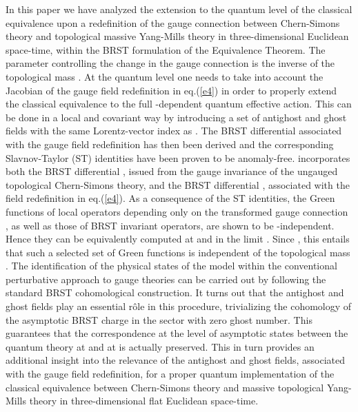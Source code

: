 \documentclass[a4paper,11pt]{article}
\begin{document}
In this paper we have analyzed the extension to the quantum level of  
the classical equivalence upon a redefinition of the gauge connection
between Chern-Simons theory and topological massive Yang-Mills theory
in three-dimensional Euclidean space-time,
within the BRST formulation of the Equivalence Theorem. 
The parameter controlling the change in the gauge connection 
is the inverse \myHighlight{$\lambda$}\coordHE{} of the topological mass \coordHE{}.  
At the quantum level one needs to take into account the Jacobian
of the gauge field redefinition in eq.(\ref{e4}) in order to
properly extend the classical equivalence to the full
\myHighlight{$\lambda$}\coordHE{}-dependent quantum effective action.
This can be done in a local and covariant way by introducing 
a set of antighost and ghost fields \coordHE{} with the
same Lorentz-vector index as \coordHE{}.
%
The BRST differential \coordHE{} associated with the gauge field
redefinition has then been derived and the corresponding Slavnov-Taylor (ST) 
identities have been proven to be anomaly-free.
\coordHE{} incorporates both the BRST differential \coordHE{}, issued from
the gauge invariance of the ungauged topological Chern-Simons theory,
and the BRST differential \myHighlight{$\delta$}\coordHE{}, associated with the field
redefinition in eq.(\ref{e4}).
As a consequence of the ST identities, 
the Green functions of local operators depending only 
on the transformed
gauge connection \coordHE{}, 
as well as those of BRST invariant operators,
are shown to be \myHighlight{$\lambda$}\coordHE{}-independent.
Hence they can be equivalently computed at \coordHE{} and
in the limit \coordHE{}. Since \coordHE{}, this entails
that such a  selected set of Green functions is independent of 
the topological mass \coordHE{}.
The identification of the physical states of the model within
the conventional perturbative approach to gauge theories can be 
carried out by following the standard BRST cohomological construction.
It turns out that the antighost and ghost fields \coordHE{}
play an essential r\^ole in this
procedure, trivializing the cohomology of the asymptotic BRST charge 
in the sector with zero ghost number.
This guarantees that the correspondence at the level of asymptotic
states between the quantum theory at \coordHE{} and at \coordHE{}  
is actually preserved.
This in turn provides an additional insight into the relevance of 
the antighost and ghost fields, associated with the gauge field redefinition,
for a proper quantum implementation of 
the classical equivalence between Chern-Simons
theory and massive topological Yang-Mills theory
in three-dimensional flat Euclidean space-time.
\end{document}
